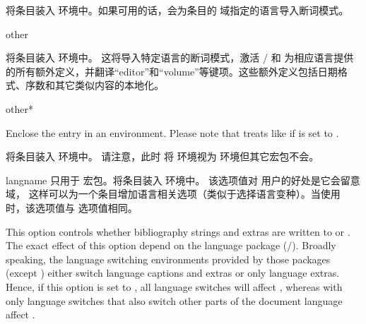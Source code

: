 \begin{optionlist}
\begin{valuelist}
将条目装入   环境中。如果可用的话，会为条目的  域指定的语言导入断词模式。

\item[other]

将条目装入  环境中。
这将导入特定语言的断词模式，激活 / 和 \biblatex 为相应语言提供的所有额外定义，并翻译“editor”和“volume”等键项。这些额外定义包括日期格式、序数和其它类似内容的本地化。

\item[other*]

Enclose the entry in an  environment. Please note that \biblatex treats  like  if  is set to .


将条目装入  环境中。
请注意，此时 \biblatex 将  环境视为  环境但其它宏包不会。

\item[langname]
只用于  宏包。将条目装入  环境中。
该选项值对  用户的好处是它会留意  域，
这样可以为一个条目增加语言相关选项（类似于选择语言变种）。当使用  时，该选项值与  选项值相同。

\end{valuelist}


This option controls whether bibliography strings and extras are written to  or . The exact effect of this option depend on the language package (/). Broadly speaking, the language switching environments provided by those packages (except ) either switch language captions and extras or only language extras. Hence, if this option is set to , all language switches will affect \biblatex, whereas with  only language switches that also switch other parts of the document language affect \biblatex.


\end{optionlist}
